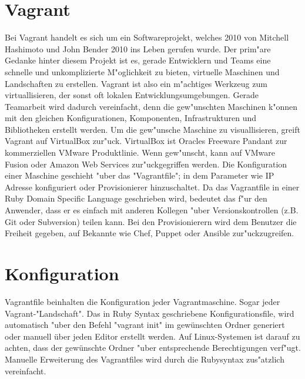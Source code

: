 \section{Vagrant}
Bei Vagrant handelt es sich um ein Softwareprojekt, welches 2010 von Mitchell Hashimoto und John Bender 2010 ins Leben gerufen wurde.
Der prim"are Gedanke hinter diesem Projekt ist es, gerade Entwicklern und Teams eine schnelle und unkomplizierte M"oglichkeit zu bieten, virtuelle Maschinen und Landschaften zu erstellen.\newline
Vagrant ist also ein m"achtiges Werkzeug zum virtuallisieren, der sonst oft lokalen Entwicklungsumgebungen. 
Gerade Teamarbeit wird dadurch vereinfacht, denn die gew"unschten Maschinen k"onnen mit den gleichen Konfigurationen, Komponenten, Infrastrukturen und Bibliotheken erstellt werden.\newline 
Um die gew"unsche Maschine zu visuallisieren, greift Vagrant auf VirtualBox zur"uck.
VirtualBox ist Oracles Freeware Pandant zur kommerziellen VMware Produktlinie. Wenn gew"unscht, kann auf VMware Fusion oder Amazon Web Services zur"uckgegriffen werden.\newline 
Die Konfiguration einer Maschine geschieht "uber das "Vagrantfile"; in dem Parameter wie IP Adresse konfiguriert oder Provisionierer hinzuschaltet.
Da das Vagrantfile in einer Ruby Domain Specific Language geschrieben wird, bedeutet das f"ur den Anwender, dass er es einfach mit anderen Kollegen "uber Versionskontrollen (z.B. Git oder Subversion) teilen kann.
Bei den Provisionierern wird dem Benutzer die Freiheit gegeben, auf Bekannte wie Chef, Puppet oder Ansible zur"uckzugreifen.

\section{Konfiguration}
Vagrantfile beinhalten die Konfiguration jeder Vagrantmaschine. Sogar jeder Vagrant-"Landschaft". 
Das in Ruby Syntax geschriebene Konfigurationsfile, wird automatisch "uber den Befehl "vagrant init" im gewünschten Ordner generiert oder manuell über jeden Editor erstellt werden. Auf Linux-Systemen ist darauf zu achten, dass der gewünschte Ordner "uber entsprechende Berechtigungen verf"ugt.
Manuelle Erweiterung des Vagrantfiles wird durch die Rubysyntax zus"atzlich vereinfacht.









